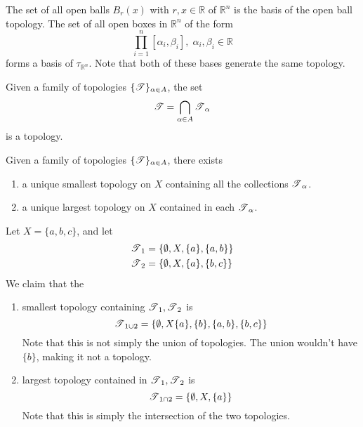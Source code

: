       \begin{example}
        The set of all open balls $B_r (x)$ with $r, x \in \mathbb{R}$ of $\mathbb{R}^n$ is the basis of the open ball topology. The set of all open boxes in $\mathbb{R}^{n}$ of the form 
        \begin{equation}
          \prod_{i=1}^n [\alpha_i, \beta_i], \; \alpha_i, \beta_i \in \mathbb{R} 
        \end{equation}
        forms a basis of $\tau_{\mathbb{R}^{n}}$. Note that both of these bases generate the same topology. 
      \end{example} 

      \begin{theorem}
        Given a family of topologies $\{\T\}_{\alpha \in A}$, the set 
        \begin{equation}
          \T = \bigcap_{\alpha \in A} \T_\alpha
        \end{equation}
        is a topology. 
      \end{theorem}

      \begin{corollary}
        Given a family of topologies $\{\T\}_{\alpha \in A}$, there exists 
        \begin{enumerate}
          \item a unique smallest topology on $X$ containing all the collections $\T_\alpha$. 
          \item a unique largest topology on $X$ contained in each $\T_\alpha$. 
        \end{enumerate}
      \end{corollary} 

      \begin{example}
        Let $X = \{a, b, c\}$, and let 
        \begin{align}
          \T_1 & = \{\emptyset, X, \{a\}, \{a, b\}\} \\
          \T_2 & = \{\emptyset, X, \{a\}, \{b, c\}\}
        \end{align}
        We claim that the 
        \begin{enumerate}
          \item smallest topology containing $\T_1, \T_2$ is 
          \begin{equation}
            \T_{1 \cup 2} = \{\emptyset, X \{a\}, \{b\}, \{a, b\}, \{b, c\}\}
          \end{equation} 
          Note that this is not simply the union of topologies. The union wouldn't have $\{b\}$, making it not a topology. 

          \item largest topology contained in $\T_1, \T_2$ is 
          \begin{equation}
            \T_{1 \cap 2} = \{\emptyset, X, \{a\}\}
          \end{equation}
          Note that this is simply the intersection of the two topologies. 
        \end{enumerate}
      \end{example}
    
